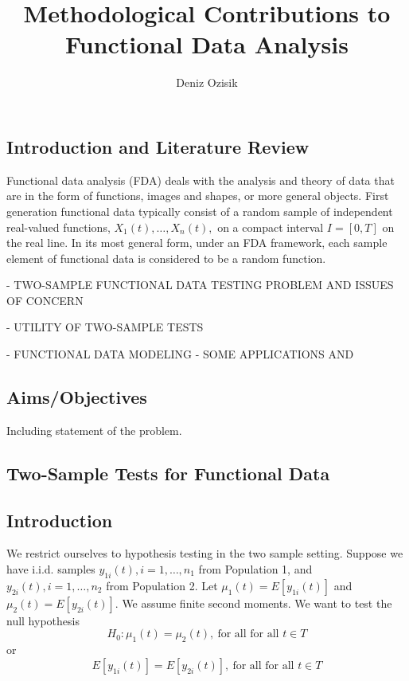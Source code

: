 \documentclass[12pt]{article}
\begin{document}
\title{Methodological Contributions to Functional Data Analysis}

\author{Deniz Ozisik}

\date{}

\maketitle

\thispagestyle{empty}

\newpage


\hrulefill
\begin{center}
\section{Introduction and Literature Review}
\end{center}
\hrulefill

Functional data analysis (FDA) deals with the analysis and theory of data that are in the form of functions,
images and shapes, or more general objects. First generation functional data typically consist of a
random sample of independent real-valued functions, $X_1(t),\ldots,X_n(t),$ on a compact interval
$I = [0, T]$ on the real line. In its most general form, under an FDA framework, each sample
element of functional data is considered to be a random function.

- TWO-SAMPLE FUNCTIONAL DATA TESTING PROBLEM AND ISSUES OF CONCERN

- UTILITY OF TWO-SAMPLE TESTS

- FUNCTIONAL DATA MODELING - SOME APPLICATIONS AND

\subsection{Aims/Objectives}
Including statement of the problem.


\newpage

\hrulefill
\begin{center}
\section{Two-Sample Tests for Functional Data}
\end{center}
\hrulefill

\subsection{Introduction}
We restrict ourselves to hypothesis testing in the two sample setting. Suppose we have
i.i.d. samples $y_{1i}(t), i = 1,\ldots, n_1$ from Population 1, and $y_{2i}(t), i = 1,\ldots, n_2$
from Population 2. Let $\mu_1(t) = E[y_{1i}(t)]$ and $\mu_2(t) = E[y_{2i}(t)].$ We assume finite
second moments. We want to test the null hypothesis
       \[H_0:\mu_1(t)=\mu_2(t),~\mbox{for all for all $t \in T$}\]
   or
      \[E[y_{1i}(t)] = E[y_{2i}(t)], ~\mbox{for all for all $t \in T$}\]
\end{document}
